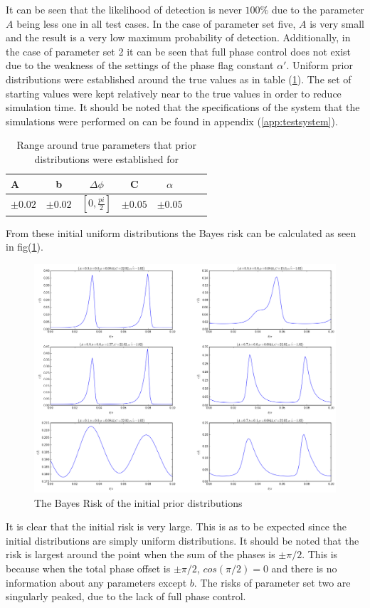 It can be seen that the likelihood of detection is never $100\%$ due to the parameter $A$ being less one in all test cases. In the case of parameter set five, $A$ is very small and the result is a very low maximum probability of detection. Additionally, in the case of parameter set 2 it can be seen that full phase control does not exist due to the weakness of the settings of the phase flag constant $\alpha'$.   Uniform prior distributions were established around the true values as in table (\ref{tab:around}). The set of starting values were kept relatively near to the true values in order to reduce simulation time. It should be noted that the specifications of the system that the simulations were performed on can be found in appendix (\ref{app:testsystem}). 
\begin{table}[h]
\begin{center}
\begin{tabular}{l*{5}{c}r}
A&b& $\Delta\phi$ & C & $\alpha$ \\
\hline
 $\pm0.02$ & $\pm0.02$ & $[0,\frac{pi}{2}]$ & $\pm0.05$ & $\pm0.05$
\end{tabular}
\caption{Range around true parameters that prior distributions were established for}
\label{tab:around}
\end{center}
\end{table}
From these initial uniform distributions the Bayes risk can be calculated as seen in fig(\ref{fig:initialdistributions}).
\begin{figure}[ht!]
\centering
\includegraphics[width=\textwidth , height=0.8\textheight]{Figures/priors.png}
\caption{The Bayes Risk of the initial prior distributions}
\label{fig:initialdistributions}
\end{figure}
It is clear that the initial risk is very large. This is as to be expected since the initial distributions are simply uniform distributions. It should be noted that the risk is largest around the point when the sum of the phases is $\pm\pi/2$. This is because when the total phase offset is $\pm\pi/2$, $cos(\pi/2)=0$ and there is no information about any parameters except $b$. The risks of parameter set two are singularly peaked, due to the lack of full phase control. 

